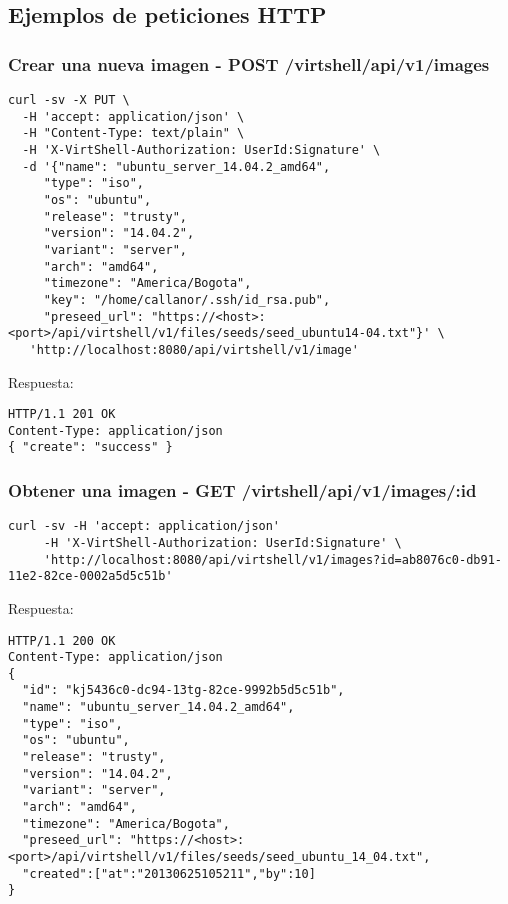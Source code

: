 \subsection{Ejemplos de peticiones HTTP}

\subsubsection{Crear una nueva imagen - POST /virtshell/api/v1/images}

\begin{lstlisting}[style=json]
curl -sv -X PUT \
  -H 'accept: application/json' \
  -H "Content-Type: text/plain" \
  -H 'X-VirtShell-Authorization: UserId:Signature' \
  -d '{"name": "ubuntu_server_14.04.2_amd64",
     "type": "iso",
     "os": "ubuntu", 
     "release": "trusty",
     "version": "14.04.2", 
     "variant": "server", 
     "arch": "amd64", 
     "timezone": "America/Bogota", 
     "key": "/home/callanor/.ssh/id_rsa.pub",
     "preseed_url": "https://<host>:<port>/api/virtshell/v1/files/seeds/seed_ubuntu14-04.txt"}' \
   'http://localhost:8080/api/virtshell/v1/image'
\end{lstlisting}

\vspace{1cm}
Respuesta:
\vspace{1cm}

\begin{lstlisting}[style=json]
HTTP/1.1 201 OK
Content-Type: application/json
{ "create": "success" }
\end{lstlisting}

\subsubsection{Obtener una imagen - GET /virtshell/api/v1/images/:id}

\begin{lstlisting}[style=json]
curl -sv -H 'accept: application/json' 
     -H 'X-VirtShell-Authorization: UserId:Signature' \ 
     'http://localhost:8080/api/virtshell/v1/images?id=ab8076c0-db91-11e2-82ce-0002a5d5c51b'
\end{lstlisting}

\vspace{1cm}
Respuesta:
\vspace{1cm}

\begin{lstlisting}[style=json]
HTTP/1.1 200 OK
Content-Type: application/json
{
  "id": "kj5436c0-dc94-13tg-82ce-9992b5d5c51b",
  "name": "ubuntu_server_14.04.2_amd64",
  "type": "iso",
  "os": "ubuntu", 
  "release": "trusty",
  "version": "14.04.2", 
  "variant": "server", 
  "arch": "amd64", 
  "timezone": "America/Bogota", 
  "preseed_url": "https://<host>:<port>/api/virtshell/v1/files/seeds/seed_ubuntu_14_04.txt",
  "created":["at":"20130625105211","by":10]
}
\end{lstlisting}


